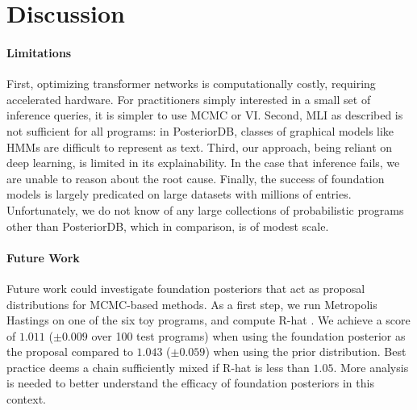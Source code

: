 \section{Discussion}
\label{sec:discussion}


\paragraph{Limitations} First, optimizing  transformer networks is computationally costly, requiring accelerated hardware. For practitioners simply interested in a small set of inference queries, it is simpler to use MCMC or VI. Second, MLI as described is not sufficient for all programs: in PosteriorDB, classes of graphical models like HMMs are difficult to represent as text. Third, our approach, being reliant on deep learning, is limited in its explainability. In the case that inference fails, we are unable to reason about the root cause. Finally, the success of foundation models \cite{bommasani2021opportunities} is largely predicated on large datasets with millions of entries. Unfortunately, we do not know of any large collections of probabilistic programs other than PosteriorDB, which in comparison, is of modest scale.

\paragraph{Future Work} Future work could investigate foundation posteriors that act as proposal distributions for MCMC-based methods.
As a first step, we run Metropolis Hastings on one of the six toy programs, and compute R-hat \cite{gelman1992inference}. We achieve a score of $1.011$ ($\pm 0.009$ over 100 test programs) when using the foundation posterior as the proposal compared to $1.043$ ($\pm 0.059$) when using the prior distribution. Best practice deems a chain sufficiently mixed if R-hat is less than $1.05$. More analysis is needed to better understand the efficacy of foundation posteriors in this context.

